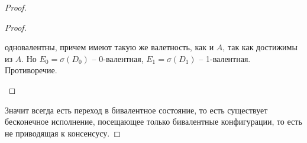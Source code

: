 \begin{proof}
\begin{proof}
\begin{itemize}
\begin{itemize}
                        одновалентны, причем имеют такую же валетность, как и $A$,
                        так как достижимы из $A$. Но $E_0 = \sigma(D_0)$ -- 0-валентная,
                        $E_1 = \sigma(D_1)$ -- 1-валентная. Противоречие.
                \end{itemize}
        \end{itemize}
    \end{proof}
    Значит всегда есть переход в бивалентное состояние, то есть существует бесконечное исполнение,
    посещающее только бивалентные конфигурации, то есть не приводящая к консенсусу.
\end{proof}


